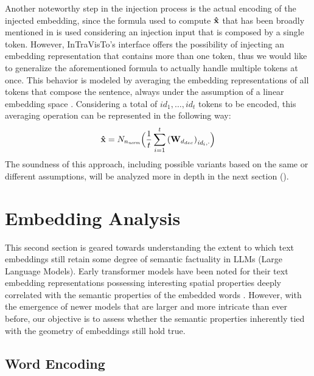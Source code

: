 Another noteworthy step in the injection process is the actual encoding of the injected embedding, since the formula used to compute $\bm{\mathbf{\hat x}}$ that has been broadly mentioned in  is used considering an injection input that is composed by a single token.
However, InTraVisTo's interface offers the possibility of injecting an embedding representation that contains more than one token, thus we would like to generalize the aforementioned formula to actually handle multiple tokens at once.
 This behavior is modeled by averaging the embedding representations of all tokens that compose the sentence, always under the assumption of a linear embedding space . 
Considering a total of $id_1,\ldots,id_t$ tokens to be encoded, this averaging operation can be represented in the following way:
\begin{equation}
    \label{eq:method_intravisto_emb-avg}
    \bm{\mathbf{\hat x}} = N_{n_\textit{norm}}\Bigl(\frac{1}{t} \sum_{i=1}^{t}{{(\bm{\mathbf{W}}_{d_{dec}})}_{\textit{id}_{i},\cdot}}\Bigr)
\end{equation}
The soundness of this approach, including possible variants based on the same or different assumptions, will be analyzed more in depth in the next section ().


\section{Embedding Analysis}\label{sec:method_embeddings}

This second section is geared towards understanding the extent to which text embeddings still retain some degree of semantic factuality in LLMs (Large Language Models).
Early transformer models have been noted for their text embedding representations possessing interesting spatial properties deeply correlated with the semantic properties of the embedded words .
However, with the emergence of newer models that are larger and more intricate than ever before, our objective is to assess whether the semantic properties inherently tied with the geometry of embeddings still hold true.

\subsection{Word Encoding}

